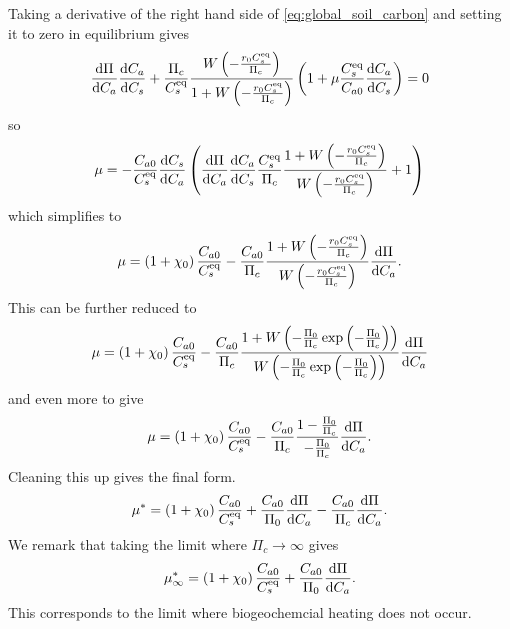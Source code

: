 Taking a derivative of the right hand side of \cref{eq:global_soil_carbon} and setting it to zero in equilibrium gives
\begin{equation}
  \label{eq:soil_carbon_lambda}
  \dv{\Pi}{C_a}\dv{C_a}{C_s} + \frac{\Pi_c}{C_s^{\mathrm{eq}}} \frac{W\left(-\frac{r_0C_s^{\mathrm{eq}}}{\Pi_c}\right)}{1+W\left(-\frac{r_0C_s^{\mathrm{eq}}}{\Pi_c}\right)} \left(
    1 + \mu \frac{C_s^{\mathrm{eq}}}{C_{a0}} \dv{C_a}{C_s}\right) = 0
\end{equation}
so
\begin{equation}
  \label{eq:critical_mu}
  \mu = -\frac{C_{a0}}{C_{s}^{\mathrm{eq}}}\dv{C_s}{C_a}\left(\dv{\Pi}{C_a}\dv{C_a}{C_s} \frac{C_s^{\mathrm{eq}}}{\Pi_c}\frac{1+W\left(-\frac{r_0C_s^{\mathrm{eq}}}{\Pi_c}\right)}{W\left(-\frac{r_0C_s^{\mathrm{eq}}}{\Pi_c}\right)} + 1 \right)
\end{equation}
which simplifies to
\begin{equation}
  \label{eq:critical_mu_simple_ocean}
  \mu = \left(1+\chi_0\right) \frac{C_{a0}}{C_{s}^{\mathrm{eq}}} -
  \frac{C_{a0}}{\Pi_c}\frac{1+W\left(-\frac{r_0C_s^{\mathrm{eq}}}{\Pi_c}\right)}{W\left(-\frac{r_0C_s^{\mathrm{eq}}}{\Pi_c}\right)}\dv{\Pi}{C_a}.
\end{equation}
This can be further reduced to
\begin{equation*}
  \mu = \left(1+\chi_0\right) \frac{C_{a0}}{C_{s}^{\mathrm{eq}}} -
  \frac{C_{a0}}{\Pi_c}
  \frac{1+W\left(-\frac{\Pi_0}{\Pi_c}\exp\left(-\frac{\Pi_0}{\Pi_c}\right)\right)}
  {W\left(-\frac{\Pi_0}{\Pi_c}\exp\left(-\frac{\Pi_0}{\Pi_c}\right)\right)}\dv{\Pi}{C_a} 
\end{equation*}
and even more to give
\begin{equation*}
  \mu = \left(1+\chi_0\right) \frac{C_{a0}}{C_{s}^{\mathrm{eq}}} -
  \frac{C_{a0}}{\Pi_c}
  \frac{1-\frac{\Pi_0}{\Pi_c}}{-\frac{\Pi_0}{\Pi_c}}\dv{\Pi}{C_a}.
\end{equation*}
Cleaning this up gives the final form.
\begin{equation}
  \label{eq:critical_mu_simple_ocean_in_terms_of_npp}
  \mu^* = \left(1+\chi_0\right) \frac{C_{a0}}{C_{s}^{\mathrm{eq}}} +
  \frac{C_{a0}}{\Pi_0} \dv{\Pi}{C_a} - \frac{C_{a0}}{\Pi_c}\dv{\Pi}{C_a}.
\end{equation}
We remark that taking the limit where $\Pi_c \rightarrow \infty$ gives
\begin{equation}
  \label{eq:mu_infinity}
  \mu^*_{\infty} =\left(1+\chi_0\right) \frac{C_{a0}}{C_{s}^{\mathrm{eq}}} +
  \frac{C_{a0}}{\Pi_0} \dv{\Pi}{C_a}.
\end{equation}
This corresponds to the limit where biogeochemcial heating does not occur.

